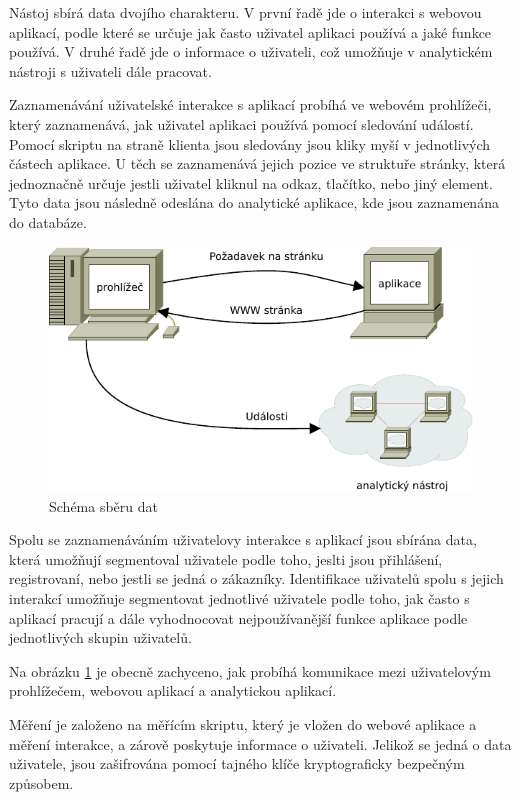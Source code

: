 \documentclass[bc,male,java,dept456]{diploma}						%
\begin{document}
Nástoj sbírá data dvojího charakteru. V první řadě jde o interakci s webovou aplikací, podle které se určuje jak často uživatel aplikaci používá a jaké funkce používá. V druhé řadě jde o informace o uživateli, což umožňuje v analytickém nástroji s uživateli dále pracovat.

Zaznamenávání uživatelské interakce s aplikací probíhá ve webovém prohlížeči, který zaznamenává, jak uživatel aplikaci používá pomocí sledování událostí. Pomocí skriptu na straně klienta jsou sledovány jsou kliky myší v jednotlivých částech aplikace. U těch se zaznamenává jejich pozice ve struktuře stránky, která jednoznačně určuje jestli uživatel kliknul na odkaz, tlačítko, nebo jiný element. Tyto data jsou následně odeslána do analytické aplikace, kde jsou zaznamenána do databáze.

\begin{figure}[h]
	\centering
	\includegraphics[width=14cm]{img/measuring.pdf}
	\caption{Schéma sběru dat}
	\label{img:measuring}
\end{figure}

Spolu se zaznamenáváním uživatelovy interakce s aplikací jsou sbírána data, která umožňují segmentoval uživatele podle toho, jeslti jsou přihlášení, registrovaní, nebo jestli se jedná o zákazníky. Identifikace uživatelů spolu s jejich interakcí umožňuje segmentovat jednotlivé uživatele podle toho, jak často s aplikací pracují a dále vyhodnocovat nejpoužívanější funkce aplikace podle jednotlivých skupin uživatelů.

Na obrázku \ref{img:measuring} je obecně zachyceno, jak probíhá komunikace mezi uživatelovým pro\-hlí\-že\-čem, webovou aplikací a analytickou aplikací.


Měření je založeno na měřícím skriptu, který je vložen do webové aplikace a měření interakce, a zárově poskytuje informace o uživateli. Jelikož se jedná o data uživatele, jsou zašifrována pomocí tajného klíče kryptograficky bezpečným způsobem.
\end{document}
